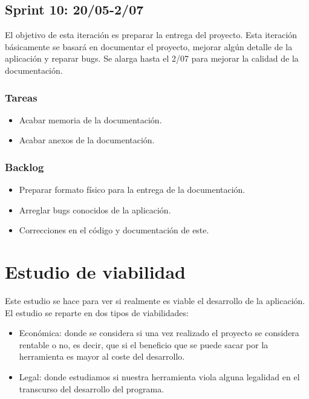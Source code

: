 \subsection{Sprint 10: 20/05-2/07}


El objetivo de esta iteración es preparar la entrega del proyecto.
Esta iteración básicamente se basará en documentar el proyecto, mejorar algún detalle de la aplicación y reparar bugs.
Se alarga hasta el 2/07 para mejorar la calidad de la documentación.

\subsubsection{Tareas}
\begin{itemize}
\item Acabar memoria de la documentación.

\item Acabar anexos de la documentación.
\end{itemize}
\subsubsection{Backlog}
\begin{itemize}

\item Preparar formato físico para la entrega de la documentación.

\item Arreglar bugs conocidos de la aplicación.

\item Correcciones en el código y documentación de este.
\end{itemize}

\section{Estudio de viabilidad}
Este estudio se hace para ver si realmente es viable el desarrollo de la aplicación.
El estudio se reparte en dos tipos de viabilidades:
\begin{itemize}
	\item Económica: donde se considera si una vez realizado el proyecto se considera rentable o no, es decir, que si el beneficio que se puede sacar por la herramienta es mayor al coste del desarrollo.

	\item Legal: donde estudiamos si nuestra herramienta viola alguna legalidad en el transcurso del desarrollo del programa. 

\end{itemize}


